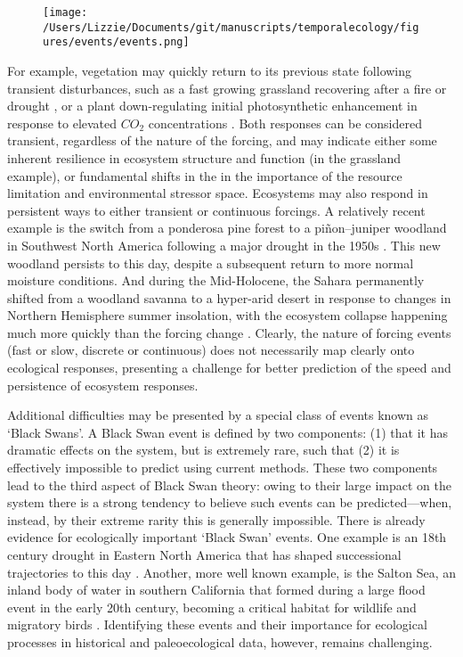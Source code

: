 \documentclass[11pt,a4paper,oneside]{article}
\begin{document}
\begin{figure}[h!]
\centering
\noindent \texttt{[image: /Users/Lizzie/Documents/git/manuscripts/temporalecology/figures/events/events.png]}
\end{figure}

For example, vegetation may quickly return to its previous state following transient disturbances, such as a fast growing grassland recovering after a fire or drought \citep[e.g.,][]{Weaver1936,albertson1944}, or a plant down-regulating initial photosynthetic enhancement in response to elevated $CO_{2}$ concentrations \citep{eatonrye2012}. Both responses can be considered transient, regardless of the nature of the forcing, and may indicate either some inherent resilience in ecosystem structure and function (in the grassland example), or fundamental shifts in the in the importance of the resource limitation and environmental stressor space. Ecosystems may also respond in persistent ways to either transient or continuous forcings. A relatively recent example is the switch from a ponderosa pine forest to a pi\~non–juniper woodland in Southwest North America following a major drought in the 1950s \citep{Allen1998}. This new woodland persists to this day, despite a subsequent return to more normal moisture conditions. And during the Mid-Holocene, the Sahara permanently shifted from a woodland savanna to a hyper-arid desert in response to changes in Northern Hemisphere summer insolation, with the ecosystem collapse happening much more quickly than the forcing change \citep{Foley2003}. Clearly, the nature of forcing events (fast or slow, discrete or continuous) does not necessarily map clearly onto ecological responses, presenting a challenge for better prediction of the speed and persistence of ecosystem responses.

Additional difficulties may be presented by a special class of events known as `Black Swans'. A Black Swan event is defined by two components: (1) that it has dramatic effects on the system, but is extremely rare, such that (2) it is effectively impossible to predict using current methods. These two components lead to the third aspect of Black Swan theory: owing to their large impact on the system there is a strong tendency to believe such events can be predicted---when, instead, by their extreme rarity this is generally impossible.  There is already evidence for ecologically important `Black Swan' events. One example is an 18th century drought in Eastern North America that has shaped successional trajectories to this day \citep{Pederson2014}. Another, more well known example, is the Salton Sea, an inland body of water in southern California that formed during a large flood event in the early 20th century, becoming a critical habitat for wildlife and migratory birds \citep{Cohn2000}. Identifying these events and their importance for ecological processes in historical and paleoecological data, however, remains challenging.\\ 
\end{document}
